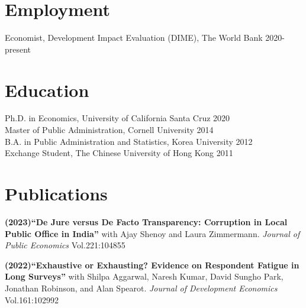 \documentclass[letterpaper, margin, 10pt]{res} %
\begin{document}
\begin{resume}


 




%


\section{\sc \textbf{Employment}}
Economist, Development Impact Evaluation (DIME), The World Bank \hfill{2020-present}

\section{\sc \textbf{Education}}
{Ph.D. in Economics, University of California Santa Cruz} \hfill 2020\\
{Master of Public Administration, Cornell University} \hfill 2014\\
{B.A. in Public Administration and Statistics, Korea University} \hfill 2012\\
{ Exchange Student, The Chinese University of Hong Kong} \hfill 2011




\normalsize\section{\textbf{Publications}}
\normalsize
{\bf (2023)``De Jure versus De Facto Transparency: Corruption in Local Public Office in India''} 
with Ajay Shenoy and Laura Zimmermann. \textit{Journal of Public Economics} Vol.221:104855

\normalsize
{\bf (2022)``Exhaustive or Exhausting? Evidence on Respondent Fatigue in Long Surveys''}
with Shilpa Aggarwal, Naresh Kumar, David Sungho Park, Jonathan Robinson, and Alan Spearot. \textit{Journal of Development Economics} Vol.161:102992



\end{resume}
\end{document}

